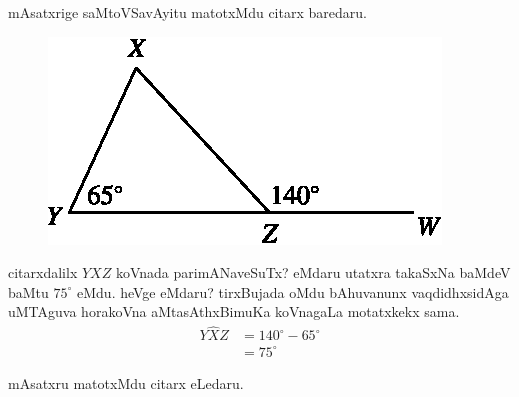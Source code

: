 mAsatxrige saMtoVSavAyitu matotxMdu citarx baredaru.
\begin{figure}[H]
\centering
\includegraphics{src/figures/m_179c.eps}
\end{figure}
citarxdalilx $YXZ$ koVnada parimANaveSuTx? eMdaru utatxra takaSxNa baMdeV baMtu $75^\circ$ eMdu. heVge eMdaru? tirxBujada oMdu bAhuvanunx vaqdidhxsidAga uMTAguva horakoVna aMtasAthxBimuKa koVnagaLa motatxkekx sama. 
\begin{align*}
Y\widehat{X}Z &=140^\circ-65^\circ\\
&=75^\circ
\end{align*}

mAsatxru matotxMdu citarx eLedaru.

